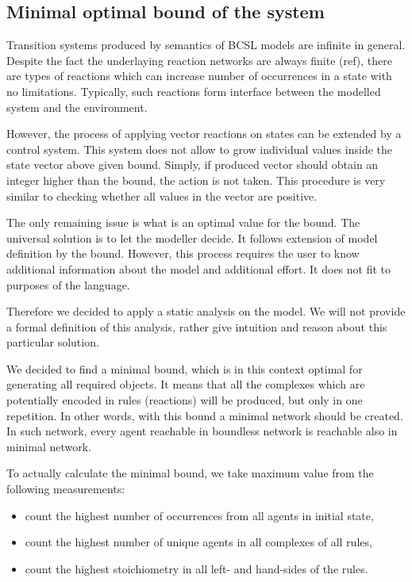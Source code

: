 \documentclass[12pt]{fithesis2}
\begin{document}
\subsection{Minimal optimal bound of the system}

Transition systems produced by semantics of BCSL models are infinite in general. Despite the fact the underlaying reaction networks are always finite (ref), there are types of reactions which can increase number of occurrences in a state with no limitations. Typically, such reactions form interface between the modelled system and the environment.

However, the process of applying vector reactions on states can be extended by a control system. This system does not allow to grow individual values inside the state vector above given bound. Simply, if produced vector should obtain an integer higher than the bound, the action is not taken. This procedure is very similar to checking whether all values in the vector are positive.

The only remaining issue is what is an optimal value for the bound. The universal solution is to let the modeller decide. It follows extension of model definition by the bound. However, this process requires the user to know additional information about the model and additional effort. It does not fit to purposes of the language.

Therefore we decided to apply a static analysis on the model. We will not provide a formal definition of this analysis, rather give intuition and reason about this particular solution.

We decided to find a minimal bound, which is in this context optimal for generating all required objects. It means that all the complexes which are potentially encoded in rules (reactions) will be produced, but only in one repetition. In other words, with this bound a minimal network should be created. In such network, every agent reachable in boundless network is reachable also in minimal network.

To actually calculate the minimal bound, we take maximum value from the following measurements:

\begin{itemize}
  \item count the highest number of occurrences from all agents in initial state,
  \item count the highest number of unique agents in all complexes of all rules,
  \item count the highest stoichiometry in all left- and hand-sides of the rules.
\end{itemize}
\end{document}
